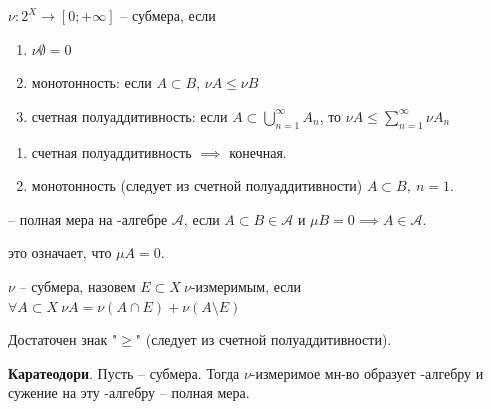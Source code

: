 \begin{definition}
    $\nu : 2^{X} \rightarrow [0; +\infty]$ -- субмера, если 

    \begin{enumerate}
        \item $\nu \emptyset = 0$
        \item монотонность: если $A \subset B$, $\nu A \leq \nu B$
        \item счетная полуаддитивность: если  $A \subset \bigcup_{n=1}^{\infty} A_n$, то $\nu A \leq \sum_{n=1}^{\infty} \nu A_n$
    \end{enumerate}
\end{definition}
\begin{remark}
    \begin{enumerate}
        \item счетная полуаддитивность $\implies$ конечная.
        \item монотонность (следует из счетной полуаддитивности) $A \subset B, \ n=1$.
    \end{enumerate}
\end{remark}

\begin{definition}
    \mu -- полная мера на \sigma-алгебре $\mathcal{A}$, если $A \subset B \in \mathcal{A}$ и $\mu B = 0 \implies A \in \mathcal{A}$.
    
    \begin{remark}
        это означает, что $\mu A = 0$.
    \end{remark}
\end{definition}

\begin{definition}
    $\nu$ -- субмера, назовем $E \subset X \ \nu$-измеримым, если $\forall A \subset X \ \nu A = \nu (A \cap E) + \nu (A \setminus E)$


    \begin{remark}
        Достаточен знак "$\geq$" (следует из счетной полуаддитивности).
    \end{remark}
\end{definition}

\begin{theorem}
    \textbf{Каратеодори}. Пусть \nu -- субмера. Тогда $\nu$-измеримое мн-во образует \sigma-алгебру и сужение \nu на эту \sigma-алгебру -- полная мера.
\end{theorem}

